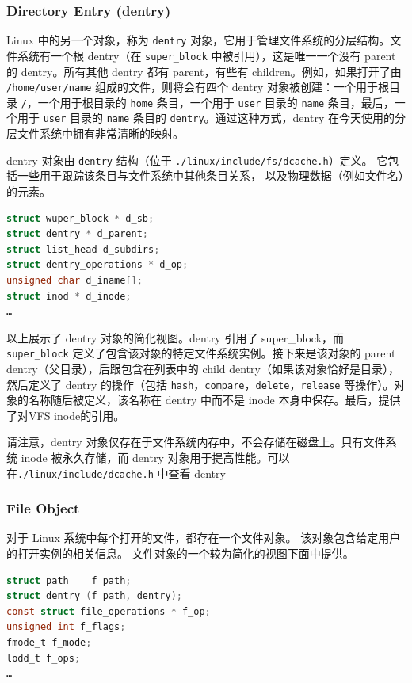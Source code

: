 \documentclass[UTF8,a4paper]{ctexart}
\begin{document}
\subsubsection{Directory Entry (dentry)}

Linux 中的另一个对象，称为 \texttt{dentry}
对象，它用于管理文件系统的分层结构。文件系统有一个根 dentry（在
\texttt{super\_block} 中被引用），这是唯一一个没有 parent 的
dentry。所有其他 dentry 都有 parent，有些有 children。例如，如果打开了由
\texttt{/home/user/name} 组成的文件，则将会有四个 dentry
对象被创建：一个用于根目录 \texttt{/}，一个用于根目录的 \texttt{home}
条目，一个用于 \texttt{user} 目录的 \texttt{name} 条目，最后，一个用于
\texttt{user} 目录的 \texttt{name} 条目的
\texttt{dentry}。通过这种方式，dentry
在今天使用的分层文件系统中拥有非常清晰的映射。

dentry 对象由 \texttt{dentry} 结构（位于
\texttt{./linux/include/fs/dcache.h}）定义。
它包括一些用于跟踪该条目与文件系统中其他条目关系，
以及物理数据（例如文件名）的元素。

\begin{lstlisting}[language=C]
struct wuper_block * d_sb;
struct dentry * d_parent;
struct list_head d_subdirs;
struct dentry_operations * d_op;
unsigned char d_iname[];
struct inod * d_inode;
…
\end{lstlisting}

以上展示了 dentry 对象的简化视图。dentry 引用了 super\_block，而
\texttt{super\_block}
定义了包含该对象的特定文件系统实例。接下来是该对象的 parent
dentry（父目录），后跟包含在列表中的 child
dentry（如果该对象恰好是目录），然后定义了 dentry 的操作（包括
\texttt{hash}，\texttt{compare}，\texttt{delete}，\texttt{release}
等操作）。对象的名称随后被定义，该名称在 dentry 中而不是 inode
本身中保存。最后，提供了对VFS inode的引用。

请注意，dentry
对象仅存在于文件系统内存中，不会存储在磁盘上。只有文件系统 inode
被永久存储，而 dentry
对象用于提高性能。可以在\texttt{./linux/include/dcache.h} 中查看 dentry

\subsubsection*{File Object}

对于 Linux
系统中每个打开的文件，都存在一个文件对象。
该对象包含给定用户的打开实例的相关信息。
文件对象的一个较为简化的视图下面中提供。

\begin{lstlisting}[language=C]
struct path    f_path;
struct dentry (f_path, dentry);
const struct file_operations * f_op;
unsigned int f_flags;
fmode_t f_mode;
lodd_t f_ops;
…
\end{lstlisting}
\end{document}
